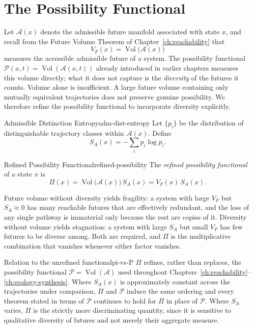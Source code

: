 \documentclass[12pt,twoside,openright]{book}
\newcommand{\adm}{\mathcal{A}}
\newcommand{\Vol}{\operatorname{Vol}}
\begin{document}
\section{The Possibility Functional}
\label{sec:ch31-functional}

Let $\mathcal{A}(x)$ denote the admissible future manifold
associated with state $x$, and recall from the Future
Volume Theorem of Chapter~\ref{ch:reachability} that
\[
  V_F(x) = \Vol\bigl(\mathcal{A}(x)\bigr)
\]
measures the accessible admissible future of a system. The
possibility functional $\mathcal{P}(x,t)=\Vol(\adm(x,t))$
already introduced in earlier chapters measures this volume
directly; what it does not capture is the \emph{diversity}
of the futures it counts. Volume alone is insufficient. A
large future volume containing only mutually equivalent
trajectories does not preserve genuine possibility. We
therefore refine the possibility functional to incorporate
diversity explicitly.

\begin{definition}{Admissible Distinction Entropy}{adm-dist-entropy}
  Let $\{p_i\}$ be the distribution of distinguishable
  trajectory classes within $\mathcal{A}(x)$. Define
  \[
    S_A(x) = -\sum_i p_i \log p_i.
  \]
\end{definition}

\begin{definition}{Refined Possibility Functional}{refined-possibility}
  The \emph{refined possibility functional} of a state $x$
  is
  \[
    \Pi(x) = \Vol\bigl(\mathcal{A}(x)\bigr)\, S_A(x)
           = V_F(x)\, S_A(x).
  \]
\end{definition}

Future volume without diversity yields fragility: a system
with large $V_F$ but $S_A\approx0$ has many reachable
futures that are effectively redundant, and the loss of any
single pathway is immaterial only because the rest are
copies of it. Diversity without volume yields stagnation: a
system with large $S_A$ but small $V_F$ has few futures to
be diverse among. Both are required, and $\Pi$ is the
multiplicative combination that vanishes whenever either
factor vanishes.

\begin{remark}{Relation to the unrefined functional}{pi-vs-P}
  $\Pi$ refines, rather than replaces, the possibility
  functional $\mathcal{P}=\Vol(\adm)$ used throughout
  Chapters~\ref{ch:reachability}--\ref{ch:ecology-synthesis}.
  Where $S_A(x)$ is approximately constant across the
  trajectories under comparison, $\Pi$ and $\mathcal{P}$
  induce the same ordering and every theorem stated in
  terms of $\mathcal{P}$ continues to hold for $\Pi$ in
  place of $\mathcal{P}$. Where $S_A$ varies, $\Pi$ is the
  strictly more discriminating quantity, since it is
  sensitive to qualitative diversity of futures and not
  merely their aggregate measure.
\end{remark}
\end{document}
